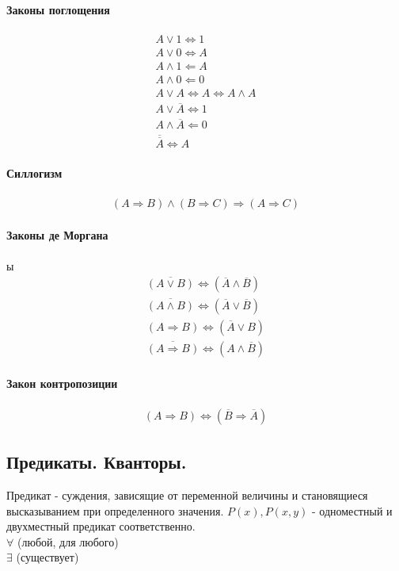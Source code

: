 \documentclass[10pt]{article}
\begin{document}
		\paragraph{Законы поглощения}
		\begin{eqnarray}
			A \vee 1 \Leftrightarrow 1 \\
			A \vee 0 \Leftrightarrow A \\
			A \wedge 1 \Leftarrow A \\
			A \wedge 0 \Leftarrow 0 \\
			A \vee A \Leftrightarrow A \Leftrightarrow A \wedge A \\
			A \vee \overline{A} \Leftrightarrow 1 \\
			A \wedge \overline{A} \Leftarrow 0\\
			\overline{\overline{A}} \Leftrightarrow A
		\end{eqnarray}
		\paragraph{Силлогизм}
		\begin{eqnarray}
			(A \Rightarrow B) \wedge (B \Rightarrow C) \Rightarrow (A \Rightarrow C)
		\end{eqnarray}
		\paragraph{Законы де Моргана}ы
		\begin{eqnarray}
			\overline{(A \vee B)} \Leftrightarrow (\overline{A} \wedge \overline{B})\\
			\overline{(A \wedge B)} \Leftrightarrow (\overline{A} \vee \overline{B}) \\
			(A \Rightarrow B) \Leftrightarrow (\overline{A} \vee B) \\
			\overline{(A \Rightarrow B) } \Leftrightarrow (A \wedge \overline{B})
		\end{eqnarray}
		\paragraph{Закон контропозиции}
		\begin{eqnarray}
			(A \Rightarrow B) \Leftrightarrow (\overline{B} \Rightarrow \overline{A})
		\end{eqnarray}
	\subsection{Предикаты. Кванторы.}
		Предикат - суждения, зависящие от переменной величины и становящиеся высказыванием при определенного значения. $P(x), P(x,y)$ - одноместный и двухместный предикат соответственно.\\
		$\forall$ (любой, для любого)\\
		$\exists$ (существует)
\end{document}
